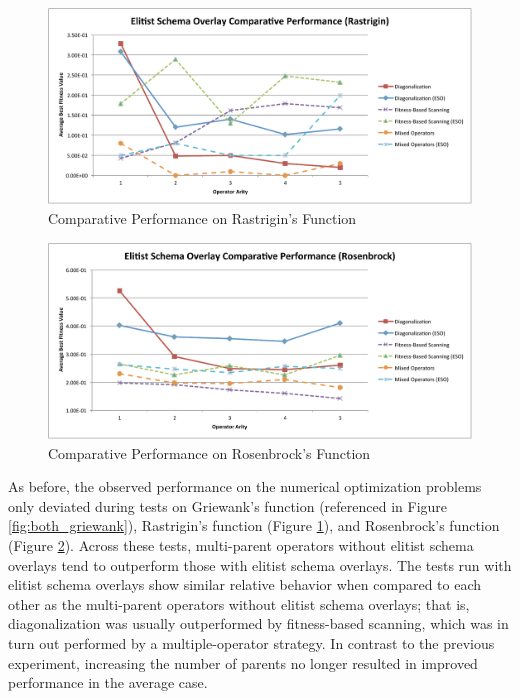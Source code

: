 \begin{figure}[htbp!]
\centering
\includegraphics[scale=0.60]{charts/Both_Rastrigin.pdf}
\caption{Comparative Performance on Rastrigin's Function}
\label{fig:both_rastrigin}
\end{figure}

\begin{figure}[htbp!]
\centering
\includegraphics[scale=0.60]{charts/Both_Rosenbrock.pdf}
\caption{Comparative Performance on Rosenbrock's Function}
\label{fig:both_rosenbrock}
\end{figure}

As before, the observed performance on the numerical optimization problems only deviated during tests on Griewank's function (referenced in Figure \ref{fig:both_griewank}), Rastrigin's function (Figure \ref{fig:both_rastrigin}), and Rosenbrock's function (Figure \ref{fig:both_rosenbrock}). Across these tests, multi-parent operators without elitist schema overlays tend to outperform those with elitist schema overlays. The tests run with elitist schema overlays show similar relative behavior when compared to each other as the multi-parent operators without elitist schema overlays; that is, diagonalization was usually outperformed by fitness-based scanning, which was in turn out performed by a multiple-operator strategy. In contrast to the previous experiment, increasing the number of parents no longer resulted in improved performance in the average case.


